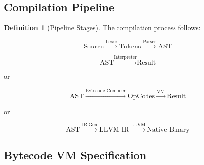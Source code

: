 \documentclass[12pt,a4paper]{article}
\theoremstyle{definition}
\newtheorem{definition}{Definition}[section]
\begin{document}
\subsection{Compilation Pipeline}

\begin{definition}[Pipeline Stages]
The compilation process follows:

\begin{equation}
\text{Source} \xrightarrow{\text{Lexer}} \text{Tokens} \xrightarrow{\text{Parser}} \text{AST}
\end{equation}

\begin{equation}
\text{AST} \xrightarrow{\text{Interpreter}} \text{Result}
\end{equation}

or

\begin{equation}
\text{AST} \xrightarrow{\text{Bytecode Compiler}} \text{OpCodes} \xrightarrow{\text{VM}} \text{Result}
\end{equation}

or

\begin{equation}
\text{AST} \xrightarrow{\text{IR Gen}} \text{LLVM IR} \xrightarrow{\text{LLVM}} \text{Native Binary}
\end{equation}
\end{definition}

\subsection{Bytecode VM Specification}
\end{document}
